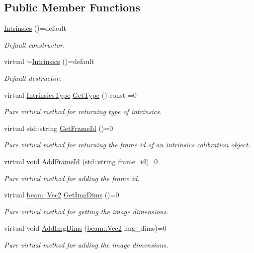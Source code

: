 \subsection*{Public Member Functions}
\begin{DoxyCompactItemize}
\item 
\hyperlink{classbeam__calibration_1_1_intrinsics_a383de3546c65f013c8c52b1ed320c8de}{Intrinsics} ()=default
\begin{DoxyCompactList}\small\item\em Default constructor. \end{DoxyCompactList}\item 
virtual \hyperlink{classbeam__calibration_1_1_intrinsics_ac2e5b7bbabb7ed19a1f770925bfac969}{$\sim$\+Intrinsics} ()=default
\begin{DoxyCompactList}\small\item\em Default destructor. \end{DoxyCompactList}\item 
virtual \hyperlink{group__calibration_ga9abafc7bdd7c31c8fdbd4cc90df9a956}{Intrinsics\+Type} \hyperlink{classbeam__calibration_1_1_intrinsics_a4e7f41934491e75c87538e5b6b0caad3}{Get\+Type} () const =0
\begin{DoxyCompactList}\small\item\em Pure virtual method for returning type of intrinsics. \end{DoxyCompactList}\item 
virtual std\+::string \hyperlink{classbeam__calibration_1_1_intrinsics_a77ed2b970f22938699a9a212eb75f7e5}{Get\+Frame\+Id} ()=0
\begin{DoxyCompactList}\small\item\em Pure virtual method for returning the frame id of an intrinsics calibration object. \end{DoxyCompactList}\item 
virtual void \hyperlink{classbeam__calibration_1_1_intrinsics_a713eb2d78358185572e56d922fc3aff2}{Add\+Frame\+Id} (std\+::string frame\+\_\+id)=0
\begin{DoxyCompactList}\small\item\em Pure virtual method for adding the frame id. \end{DoxyCompactList}\item 
virtual \hyperlink{group__utils_ga6112bda54e53755ab14060144285c6b0}{beam\+::\+Vec2} \hyperlink{classbeam__calibration_1_1_intrinsics_a0084b28677b9a242e0f3d8dbaf3ea252}{Get\+Img\+Dims} ()=0
\begin{DoxyCompactList}\small\item\em Pure virtual method for getting the image dimensions. \end{DoxyCompactList}\item 
virtual void \hyperlink{classbeam__calibration_1_1_intrinsics_affd89d4facbec94f8b4ad13ea658c12f}{Add\+Img\+Dims} (\hyperlink{group__utils_ga6112bda54e53755ab14060144285c6b0}{beam\+::\+Vec2} img\+\_\+dims)=0
\begin{DoxyCompactList}\small\item\em Pure virtual method for adding the image dimensions. \end{DoxyCompactList}\end{DoxyCompactItemize}


